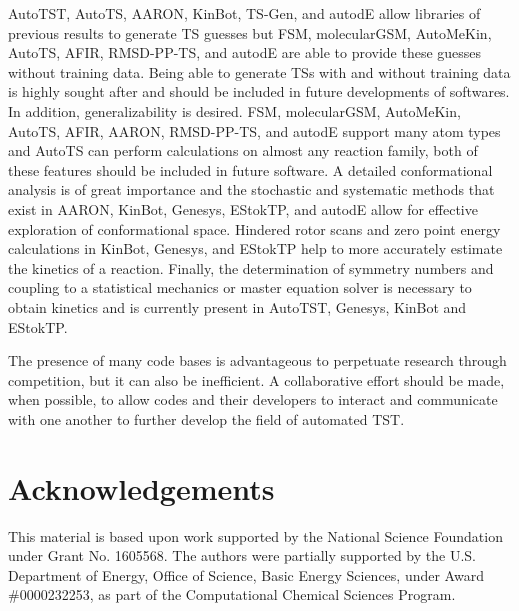\documentclass[preprint, 11pt]{elsarticle} %
\begin{document}
AutoTST, AutoTS, AARON, KinBot, TS-Gen, and autodE allow libraries of previous results to generate TS guesses but FSM, molecularGSM, AutoMeKin, AutoTS, AFIR, RMSD-PP-TS, and autodE are able to provide these guesses without training data.
Being able to generate TSs with and without training data is highly sought after and should be included in future developments of softwares.
In addition, generalizability is desired.
FSM, molecularGSM, AutoMeKin, AutoTS, AFIR, AARON, RMSD-PP-TS, and autodE support many atom types and AutoTS can perform calculations on almost any reaction family, both of these features should be included in future software.
A detailed conformational analysis is of great importance and the stochastic and systematic methods that exist in AARON, KinBot, Genesys, EStokTP, and autodE allow for effective exploration of conformational space.
Hindered rotor scans and zero point energy calculations in KinBot, Genesys, and EStokTP help to more accurately estimate the kinetics of a reaction.
Finally, the determination of symmetry numbers and coupling to a statistical mechanics or master equation solver is necessary to obtain kinetics and is currently present in AutoTST, Genesys, KinBot and EStokTP.

The presence of many code bases is advantageous to perpetuate research through competition, but it can also be inefficient.
A collaborative effort should be made, when possible, to allow codes and their developers to interact and communicate with one another to further develop the field of automated TST.



\section{Acknowledgements}

This material is based upon work supported by the National Science Foundation under Grant No. 1605568.
The authors were partially supported by the U.S. Department of Energy, Office of Science, Basic Energy Sciences, under Award \#0000232253, as part of the Computational Chemical Sciences Program.



\end{document}
